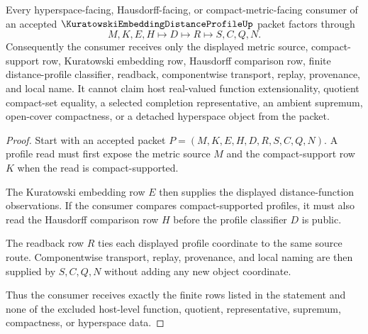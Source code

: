 \begin{theorem}
\label{thm:kuratowski-embedding-distance-profile-handoff}
Every hyperspace-facing, Hausdorff-facing, or compact-metric-facing consumer of an accepted $\KuratowskiEmbeddingDistanceProfileUp$ packet factors through
$$
M,K,E,H \longmapsto D \longmapsto R \longmapsto S,C,Q,N .
$$
Consequently the consumer receives only the displayed metric source, compact-support row, Kuratowski embedding row, Hausdorff comparison row, finite distance-profile classifier, readback, componentwise transport, replay, provenance, and local name. It cannot claim host real-valued function extensionality, quotient compact-set equality, a selected completion representative, an ambient supremum, open-cover compactness, or a detached hyperspace object from the packet.
\end{theorem}
\begin{proof}
Start with an accepted packet $P=(M,K,E,H,D,R,S,C,Q,N)$. A profile read must first expose the metric source $M$ and the compact-support row $K$ when the read is compact-supported.

The Kuratowski embedding row $E$ then supplies the displayed distance-function observations. If the consumer compares compact-supported profiles, it must also read the Hausdorff comparison row $H$ before the profile classifier $D$ is public.

The readback row $R$ ties each displayed profile coordinate to the same source route. Componentwise transport, replay, provenance, and local naming are then supplied by $S,C,Q,N$ without adding any new object coordinate.

Thus the consumer receives exactly the finite rows listed in the statement and none of the excluded host-level function, quotient, representative, supremum, compactness, or hyperspace data.
\end{proof}


